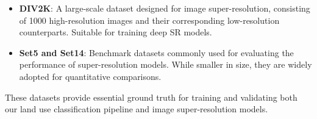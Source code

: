 \begin{itemize}
  \item \textbf{DIV2K}: A large-scale dataset designed for image super-resolution, consisting of 1000 high-resolution images and their corresponding low-resolution counterparts. Suitable for training deep SR models.
  \item \textbf{Set5 and Set14}: Benchmark datasets commonly used for evaluating the performance of super-resolution models. While smaller in size, they are widely adopted for quantitative comparisons.
\end{itemize}

These datasets provide essential ground truth for training and validating both our land use classification pipeline and image super-resolution models.

